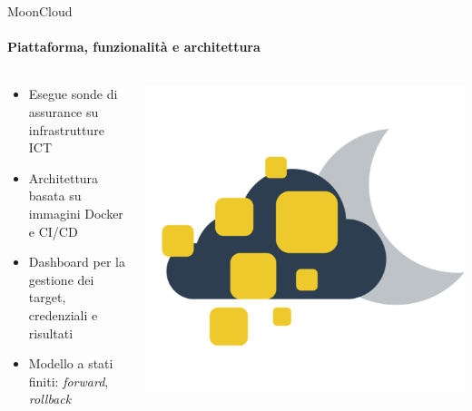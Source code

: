 \documentclass{beamer}
\begin{document}
\begin{frame}{MoonCloud}
    \framesubtitle{Piattaforma, funzionalità e architettura}
    \begin{columns}
        \begin{column}{0.7\textwidth}
            \begin{itemize}
                \item Esegue sonde di assurance su infrastrutture ICT
                \item Architettura basata su immagini Docker e CI/CD
                \item Dashboard per la gestione dei target, credenziali e risultati
                \item Modello a stati finiti: \textit{forward}, \textit{rollback}
            \end{itemize}
        \end{column}
        \begin{column}{0.3\textwidth}
            \includegraphics[width=\textwidth]{assets/mooncloud.png}
        \end{column}
    \end{columns}
\end{frame}
\end{document}
